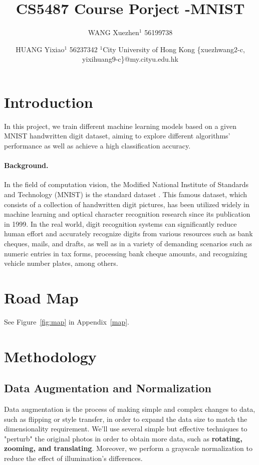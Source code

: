 \documentclass{article}
\title{CS5487 Course Porject -MNIST}
\author{
WANG Xuezhen$^1$ 56199738
\and
HUANG Yixiao$^1$ 56237342
\affiliations
$^1$City University of Hong Kong
\emails
\{xuezhwang2-c, yixihuang9-c\}@my.cityu.edu.hk
}
\begin{document}
\maketitle


\section{Introduction}
In this project, we train different machine learning models based on a given MNIST handwritten digit dataset, aiming to explore different algorithms' performance as well as achieve a high classification accuracy.

\paragraph{Background.}
In the field of computation vision, the Modiﬁed National Institute of Standards and Technology (MNIST) is the standard dataset \cite{deng2012mnist}. This famous dataset, which consists of a collection of handwritten digit pictures, has been utilized widely in machine learning and optical character recognition research since its publication in 1999. In the real world, digit recognition systems can significantly reduce human effort and accurately recognize digits from various resources such as bank cheques, mails, and drafts, as well as in a variety of demanding scenarios such as numeric entries in tax forms, processing bank cheque amounts, and recognizing vehicle number plates, among others.

\section{Road Map}
See Figure~\ref{fig:map} in Appendix~\ref{map}.

\section{Methodology}
\subsection{Data Augmentation and Normalization}
Data augmentation is the process of making simple and complex changes to data, such as flipping or style transfer, in order to expand the data size to match the dimensionality requirement. We'll use several simple but effective techniques to "perturb" the original photos in order to obtain more data, such as \textbf{rotating, zooming, and translating}. Moreover, we perform a grayscale normalization to reduce the effect of illumination’s differences. 
\end{document}
